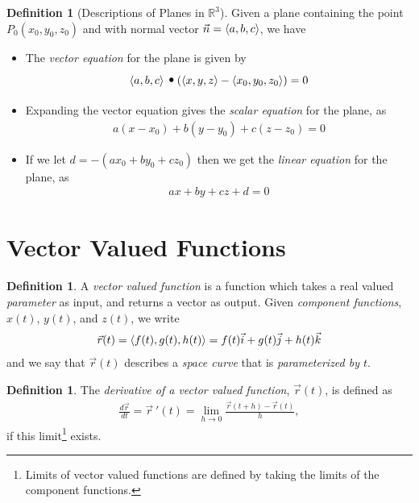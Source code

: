 \documentclass{article}[11pt]
\theoremstyle{definition}
\newtheorem{definition}[theorem]{Definition}
\DeclareMathOperator*{\dotprod}{\scalerel*{\cdot}{\bigodot}}
\DeclarePairedDelimiter\vecvec{\langle}{\rangle}
\numberwithin{equation}{section}
\begin{document}
\begin{definition}[Descriptions of Planes in \(\mathbb{R}^3\)]
	Given a plane containing the point \(P_0(x_0,y_0,z_0)\) and with normal vector \(\vec{n}=\vecvec{a,b,c} \), we have
	\begin{itemize}
		\item The \emph{vector equation} for the plane is given by
			\begin{align}
				\vecvec{a,b,c}\dotprod(\vecvec{x,y,z}-\vecvec{x_0,y_0,z_0})=0
			\end{align}
		\item Expanding the vector equation gives the \emph{scalar equation} for the plane, as
			\begin{align}
				a(x-x_0)+b(y-y_0)+c(z-z_0)=0
			\end{align}
		\item If we let \(d=-(ax_0+by_0+cz_0)\) then we get the \emph{linear equation} for the plane, as
			\begin{align}
				ax+by+cz+d=0
			\end{align}
	\end{itemize}
\end{definition}

\section{Vector Valued Functions}

\begin{definition}
	A \emph{vector valued function} is a function which takes a real valued \emph{parameter} as input, and returns a vector as output. Given \emph{component functions}, \(x(t)\), \(y(t)\), and \(z(t)\), we write
	\begin{align*}
	\vec{r}(t)=\vecvec{f(t),g(t),h(t)}=f(t)\vec{i}+g(t)\vec{j}+h(t)\vec{k}
	\end{align*}
	and we say that \(\vec{r}(t)\) describes a \emph{space curve} that is  \emph{parameterized by \(t\)}.
\end{definition}

\begin{definition}
	The \emph{derivative of a vector valued function}, \(\vec{r}(t)\), is defined as
	\begin{align*}
	\frac{d\vec{r}}{dt}=\vec{r}\:'(t)=\lim_{h\to 0}\frac{\vec{r}(t+h)-\vec{r}(t)}{h},
	\end{align*}
	if this limit\footnote{Limits of vector valued functions are defined by taking the limits of the component functions.} exists.
\end{definition}
\end{document}
